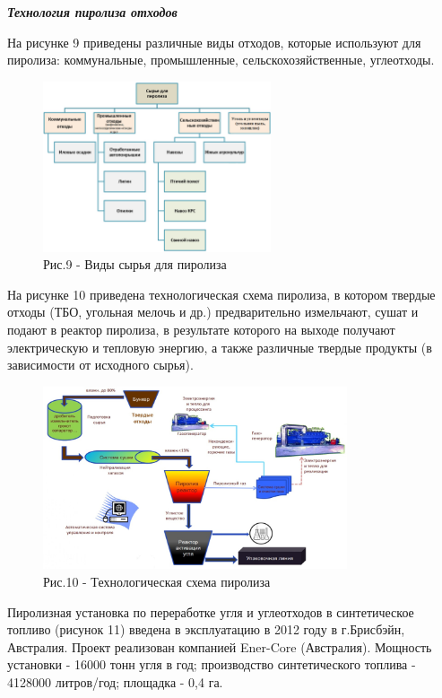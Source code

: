 \emph{{\bfseries Технология пиролиза отходов}}

На рисунке 9 приведены различные виды отходов, которые используют для
пиролиза: коммунальные, промышленные, сельскохозяйственные, углеотходы.


\begin{figure}[H]
	\centering
	\includegraphics[width=0.6\textwidth]{media/chem2/image72}
	\caption*{Рис.9 - Виды сырья для пиролиза}
\end{figure}

\begin{multicols}{2}
На рисунке 10 приведена технологическая схема пиролиза, в котором
твердые отходы (ТБО, угольная мелочь и др.) предварительно измельчают,
сушат и подают в реактор пиролиза, в результате которого на выходе
получают электрическую и тепловую энергию, а также различные твердые
продукты (в зависимости от исходного сырья).
\end{multicols}

\begin{figure}[H]
	\centering
	\includegraphics[width=0.8\textwidth]{media/chem2/image73}
	\caption*{Рис.10 - Технологическая схема пиролиза}
\end{figure}

Пиролизная установка по переработке угля и углеотходов в синтетическое
топливо (рисунок 11) введена в эксплуатацию в 2012 году в г.Брисбэйн,
Австралия. Проект реализован компанией Ener-Core (Австралия). Мощность
установки - 16000 тонн угля в год; производство синтетического топлива -
4128000 литров/год; площадка - 0,4 га.

